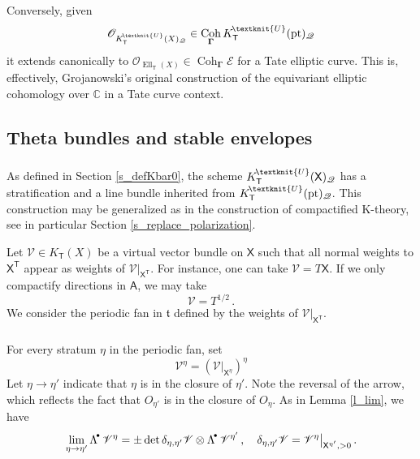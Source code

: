 \documentclass[14pt]{extarticle}
\newcommand{\Kn}{K^{\! \tiny\textknit{U}}}
\newcommand{\C}{\mathbb{C}}
\newcommand{\Q}{\mathbb{Q}}
\newcommand{\bT}{\mathsf{T}}
\newcommand{\bA}{\mathsf{A}}
\newcommand{\bX}{\mathsf{X}}
\newcommand{\cQ}{\mathscr{Q}}
\newcommand{\cV}{\mathscr{V}}
\newcommand{\cE}{\mathscr{E}}
\newcommand{\bGamma}{\boldsymbol{\Gamma}}
\newcommand{\ft}{\mathfrak{t}}
\newcommand{\cO}{\mathscr{O}}
\DeclareMathOperator{\Coh}{Coh}
\DeclareMathOperator{\Ell}{Ell}
\DeclareMathOperator{\pt}{pt}
\DeclareMathOperator{\Pic}{Pic}
\newcommand{\Ld}{{\Lambda}^{\!\raisebox{0.5mm}{$\scriptscriptstyle
      \bullet$}}\!}
\theoremstyle{definition}
\begin{document}
\subsubsection{}

Conversely, given
$$
\cO_{\Kn_{\bT}(X)_\cQ}\in \Coh_{\bGamma} \Kn_\bT(\pt)_\cQ
$$ 
it extends canonically to $\cO_{\Ell_\bT(X)}\in \Coh_{\bGamma} \cE$
for a Tate elliptic curve. This is, effectively,
Grojanowski's original construction of the equivariant
elliptic cohomology over $\C$ in a Tate curve context.


\subsection{Theta bundles and stable envelopes}

\subsubsection{}

As defined in Section \ref{s_defKbar0}, the scheme $\Kn_{\bT}(\bX)_\cQ$
has a stratification and a line bundle inherited from
$\Kn_{\bT}(\pt)_\cQ$.  This construction may be generalized as
in the construction of compactified K-theory, see in particular Section
\ref{s_replace_polarization}. 

Let $\cV\in K_\bT(X)$ be a virtual vector bundle on $\bX$ such that all normal weights to
$\bX^\bT$ appear as weights of $\cV\big|_{\bX^\bT}$.  For instance, one 
can take $\cV=T\bX$. If we only compactify directions in $\bA$, we may
take
$$
\cV = T^{1/2} \,.
$$
We consider the periodic fan in $\ft$ defined by the weights
of $\cV\big|_{\bX^\bT}$. 


\subsubsection{}

For every stratum $\eta$ in the periodic fan, set
$$
\cV^\eta = \left(\cV\big|_{\bX^\eta} \right)^\eta
$$
Let $\eta\to \eta'$ indicate that $\eta$ is in the closure of $\eta'$.
Note the reversal of the arrow, which reflects the fact that 
$O_{\eta'}$ is in the closure of $O_{\eta}$. As in
Lemma \ref{l_lim}, we have
$$
\lim_{\eta\to \eta'} \Ld \,\,  \cV^{\eta} = \pm \det
\delta_{\eta,\eta'} \cV \otimes \Ld \,\,  \cV^{\eta'} \,, \quad
\delta_{\eta,\eta'} \cV = \cV^\eta\big|_{\bX^{\eta'},>0} \,. 
$$
\end{document}
